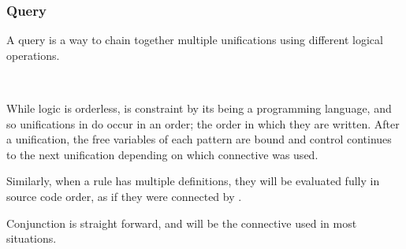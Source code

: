 \subsubsection{Query}

A query is a way to chain together multiple unifications using different
logical operations.

\begin{bnf*}
     \\
\end{bnf*}

While logic is orderless, \Law{} is constraint by its being a programming language,
and so unifications in \Law{} do occur in an order; the order in which they are
written. After a unification, the free variables of each pattern are bound and
control continues to the next unification depending on which connective was used.

Similarly, when a rule has multiple definitions, they will be evaluated fully in
source code order, as if they were connected by .

\begin{prooftree}
\end{prooftree}

Conjunction is straight forward, and will be the connective used in most situations.

\begin{center}
    \parbox[t]{0.45\linewidth}{
    \begin{prooftree}
    \end{prooftree}
    }
    \quad
    \parbox[t]{0.45\linewidth}{
    \begin{prooftree}
    \end{prooftree}
}
\end{center}

